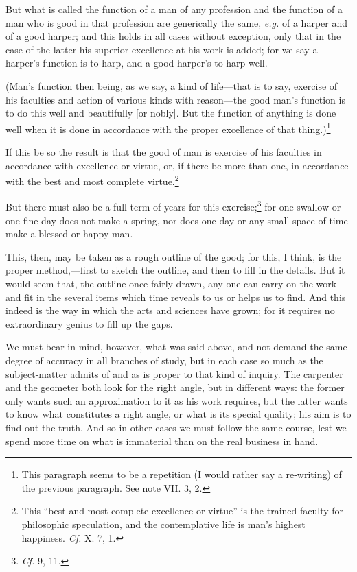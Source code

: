 But what is called the function of a man of any profession and the
function of a man who is good in that profession are generically the
same, \textit{e.g.} of a harper and of a good harper; and this holds
in all cases without exception, only that in the case of the latter
his superior excellence at his work is added; for we say a harper's
function is to harp, and a good harper's to harp well.

(Man's function then being, as we say, a kind of life---that is to
say, exercise of his faculties and action of various kinds with
reason---the good man's function is to do this well and beautifully
[or nobly]. But the function of anything is done well when it is done
in accordance with the proper excellence of that thing.)\footnote{This
paragraph seems to be a repetition (I would rather say a re-writing)
of the previous paragraph. See note VII. 3, 2.}

If this be so the result is that the good of man is exercise
of his faculties in accordance with excellence or virtue, or, if there
be more than one, in accordance with the best and most complete
virtue.\footnote{This ``best and most complete excellence or virtue''
is the trained faculty for philosophic speculation, and the
contemplative life is man's highest happiness. \textit{Cf.} X. 7, 1.}

But there must also be a full term of years for this
exercise;\footnote{\textit{Cf.} 9, 11.} for one swallow or one fine
day does not make a spring, nor does one day or any small space of
time make a blessed or happy man.

This, then, may be taken as a rough outline of the good; for this, I
think, is the proper method,---first to sketch the outline, and then
to fill in the details. But it would seem that, the outline once
fairly drawn, any one can carry on the work and fit in the several
items which time reveals to us or helps us to find. And this indeed is
the way in which the arts and sciences have grown; for it requires no
extraordinary genius to fill up the gaps.

We must bear in mind, however, what was said above, and not demand the
same degree of accuracy in all branches of study, but in each case so
much as the subject-matter admits of and as is proper to that kind of
inquiry. The carpenter and the geometer both look for the right angle,
but in different ways: the former only wants such an approximation to
it as his work requires, but the latter wants to know what constitutes
a right angle, or what is its special quality; his aim is to find out
the truth. And so in other cases we must follow the same course, lest
we spend more  time on what is immaterial than on the real
business in hand.

